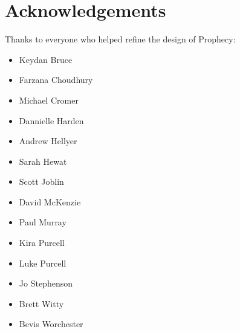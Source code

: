 \documentclass[12pt, a5paper, parskip=half-]{scrartcl}
\begin{document}
\section*{Acknowledgements}
Thanks to everyone who helped refine the design of Prophecy:
\begin{multicols}{2}
\begin{itemize}
  \item Keydan Bruce
  \item Farzana Choudhury
  \item Michael Cromer
  \item Dannielle Harden
  \item Andrew Hellyer
  \item Sarah Hewat
  \item Scott Joblin
  \item David McKenzie
  \item Paul Murray
  \item Kira Purcell
  \item Luke Purcell
  \item Jo Stephenson
  \item Brett Witty
  \item Bevis Worchester
  
\end{itemize}
\end{multicols}
\end{document}
